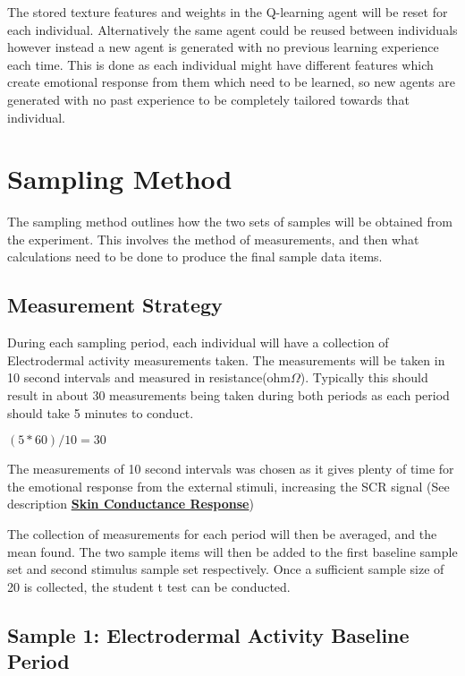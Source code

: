 \documentclass{report}
\begin{document}
The stored texture features and weights in the Q-learning agent will be reset for each individual. Alternatively the same agent could be reused between individuals 
however instead a new agent is generated with no previous learning experience each time. This is done as each individual might have different features which
create emotional response from them which need to be learned, so new agents are generated with no past experience to be completely tailored towards that individual. 

\section{Sampling Method}
The sampling method outlines how the two sets of samples will be obtained from the experiment. This involves the method of measurements, and then what calculations need to be 
done to produce the final sample data items.

\subsection{Measurement Strategy}

During each sampling period, each individual will have a collection of Electrodermal activity measurements taken. The measurements will be taken in 10 second intervals
and measured in resistance(ohm$\Omega$). Typically this should result in about 30 measurements being taken during both periods as each period should take 5 minutes to conduct.

\centerline{$(5 * 60) / 10 = 30$}

The measurements of 10 second intervals was chosen as it gives plenty of time for the emotional response from the external stimuli, increasing the SCR signal (See description \hyperlink{txt:scr}{\textbf{Skin Conductance Response}})

The collection of measurements for each period will then be averaged, and the mean found. The two sample items will then be added to the first baseline sample 
set and second stimulus sample set respectively. Once a sufficient sample size of 20 is collected, the student t test can be conducted.

\subsection{Sample 1: Electrodermal Activity Baseline Period}
\end{document}
